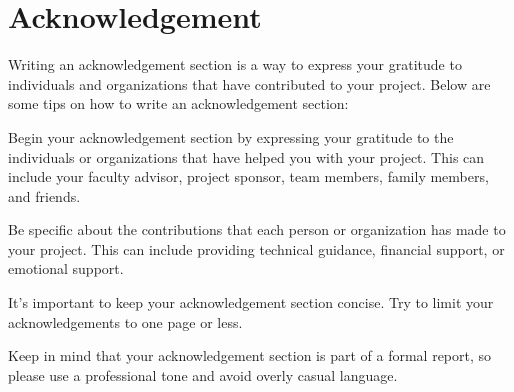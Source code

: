 \documentclass[../individual_thesis.tex]{subfiles}
\begin{document}
\chapter*{Acknowledgement}
Writing an acknowledgement section is a way to express your gratitude to individuals and organizations that have contributed to your project. Below are some tips on how to write an acknowledgement section:

Begin your acknowledgement section by expressing your gratitude to the individuals or organizations that have helped you with your project. This can include your faculty advisor, project sponsor, team members, family members, and friends.

Be specific about the contributions that each person or organization has made to your project. This can include providing technical guidance, financial support, or emotional support.

It's important to keep your acknowledgement section concise. Try to limit your acknowledgements to one page or less.

Keep in mind that your acknowledgement section is part of a formal report, so please use a professional tone and avoid overly casual language.
\end{document}
